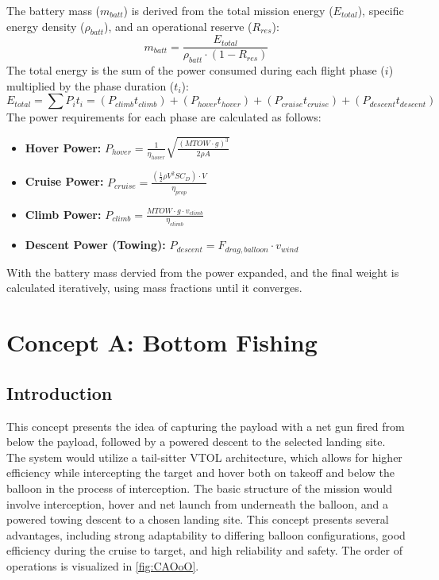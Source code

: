 The battery mass ($m_{batt}$) is derived from the total mission energy ($E_{total}$), specific energy density ($\rho_{batt}$), and an operational reserve ($R_{res}$):
\begin{equation}
    m_{batt} = \frac{E_{total}}{\rho_{batt} \cdot (1 - R_{res})}
\end{equation}
The total energy is the sum of the power consumed during each flight phase ($i$) multiplied by the phase duration ($t_i$):
\begin{equation}
    E_{total} = \sum P_i t_i = (P_{climb} t_{climb}) + (P_{hover} t_{hover}) + (P_{cruise} t_{cruise}) + (P_{descent} t_{descent})
\end{equation}
The power requirements for each phase are calculated as follows:
\begin{itemize}
    \item \textbf{Hover Power:} $P_{hover} = \frac{1}{\eta_{hover}} \sqrt{\frac{(MTOW \cdot g)^3}{2 \rho A}}$
    \item \textbf{Cruise Power:} $P_{cruise} = \frac{(\frac{1}{2} \rho V^2 S C_D) \cdot V}{\eta_{prop}}$
    \item \textbf{Climb Power:} $P_{climb} = \frac{MTOW \cdot g \cdot v_{climb}}{\eta_{climb}}$
    \item \textbf{Descent Power (Towing):} $P_{descent} = F_{drag, balloon} \cdot v_{wind}$
\end{itemize}

With the battery mass dervied from the power expanded, and the final weight is calculated iteratively, using mass fractions until it converges.


\section{Concept A: Bottom Fishing}
\label{sec:concept_A}

\subsection{Introduction}
This concept presents the idea of capturing the payload with a net gun fired from below the payload, followed by a powered descent to the selected landing site. The system would utilize a tail-sitter VTOL architecture, which allows for higher efficiency while intercepting the target and hover both on takeoff and below the balloon in the process of interception. The basic structure of the mission would involve interception, hover and net launch from underneath the balloon, and a powered towing descent to a chosen landing site. This concept presents several advantages, including strong adaptability to differing balloon configurations, good efficiency during the cruise to target, and high reliability and safety. The order of operations is visualized in \autoref{fig:CAOoO}.

